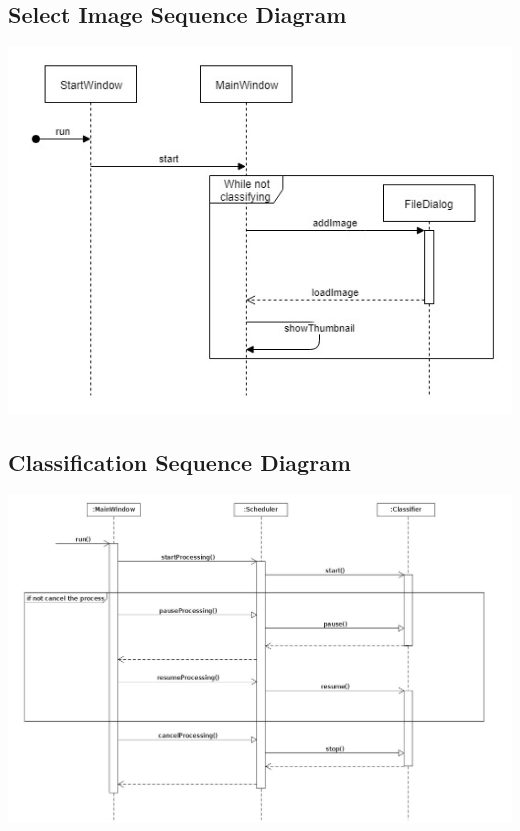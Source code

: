 \documentclass[parskip=full]{scrartcl}
\begin{document}
\subsection {Select Image Sequence Diagram}

\begin{center}
\includegraphics[width=1.0\textwidth]{SelectImageSeqDiag.jpg}
\end{center}

\pagebreak

\subsection {Classification Sequence Diagram}

\begin{center}
\includegraphics[width=1.0\textwidth]{Classification.jpg}
\end{center}
\end{document}
